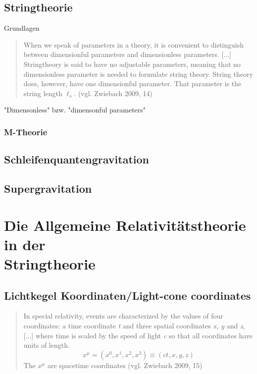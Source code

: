 \documentclass[a4paper, 12pt]{article}
\begin{document}
\subsection{Stringtheorie}
Grundlagen
\begin{quote}
When we speak of parameters in a theory, it is convenient to distinguish between dimensionful parameters and dimensionless parameters. [...] Stringtheory is said to have no adjustable parameters, meaning that no dimensionless parameter is needed to formulate string theory. String theory does, however, have one dimensionful parameter. That parameter is the string length $\ell_s$. (vgl. Zwiebach 2009, 14)\\
\end{quote}

\noindent "Dimensonless" bzw. "dimensonful parameters" 
\subsubsection{M-Theorie}

\subsection{Schleifenquantengravitation}

\subsection{Supergravitation}

\section{Die Allgemeine Relativitätstheorie in der \\ Stringtheorie}

\subsection{Lichtkegel Koordinaten/Light-cone coordinates}
\begin{quote}

In special relativity, events are characterized by the values of four coordinates: a time coordinate \textit{t} and three spatial coordinates \textit{x, y} and \textit{z}, [...] where time is scaled by the speed of light \textit{c} so that all coordinates have units of length. $$ x^ \mu = (x^0,x^1,x^2,x^3) \equiv (ct,x,y,z)$$
The $x^ \mu$ are spacetime coordinates (vgl. Zwiebach 2009, 15)
\end{quote}
\end{document}
